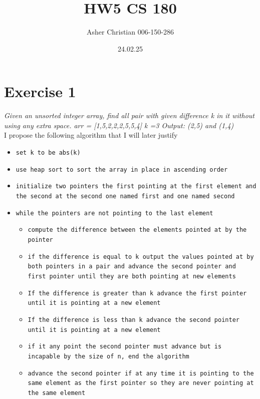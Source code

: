 \documentclass{amsart}
\title{HW5 CS 180}
\author{Asher Christian 006-150-286}
\date{ 24.02.25}
\begin{document}
\maketitle

\section{Exercise 1}
\emph{
    Given an unsorted integer array, find all pair with given difference k in it without using any
    extra space.
    arr = [1,5,2,2,2,5,5,4] k =3
    Output: (2,5) and (1,4)
}\\
I propose the following algorithm that I will later justify
{\small
    \begin{itemize}
        \item \texttt{set k to be abs(k)}
        \item \texttt{use heap sort to sort the array in place in ascending order}
        \item \texttt{initialize two pointers the first pointing at the first element and the second at the second one named first and one named second}
        \item \texttt{while the pointers are not pointing to the last element}
            \begin{itemize}
                \item \texttt{compute the difference between the elements pointed at by the pointer}
                \item \texttt{if the difference is equal to k output the values pointed at by both pointers in a pair and advance the second pointer and first pointer until they are both
                    pointing at new elements}
                \item \texttt{If the difference is greater than k advance the first pointer until it is pointing at a new element}
                \item \texttt{If the difference is less than k advance the second pointer until it is pointing at a new element}
                \item \texttt{if it any point the second pointer must advance but is incapable by the size of n, end the algorithm}
                \item \texttt{advance the second pointer if at any time it is pointing to the same element as the first pointer so they are never pointing at the same element}
            \end{itemize}
    \end{itemize}
}
\end{document}
